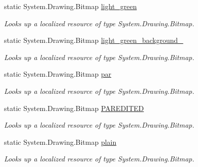 \begin{DoxyCompactItemize}
static System.\+Drawing.\+Bitmap \hyperlink{classWildlifeTrackingApp_1_1Properties_1_1Resources_a9d50b18360e8349f940ae5562791c430}{light\+\_\+green}
\begin{DoxyCompactList}\small\item\em Looks up a localized resource of type System.\+Drawing.\+Bitmap. \end{DoxyCompactList}\item 
static System.\+Drawing.\+Bitmap \hyperlink{classWildlifeTrackingApp_1_1Properties_1_1Resources_abb170f035e4e40293fc18a5ae75104c0}{light\+\_\+green\+\_\+background\+\_}
\begin{DoxyCompactList}\small\item\em Looks up a localized resource of type System.\+Drawing.\+Bitmap. \end{DoxyCompactList}\item 
static System.\+Drawing.\+Bitmap \hyperlink{classWildlifeTrackingApp_1_1Properties_1_1Resources_a22fc764559548610cceff5de0437f793}{par}
\begin{DoxyCompactList}\small\item\em Looks up a localized resource of type System.\+Drawing.\+Bitmap. \end{DoxyCompactList}\item 
static System.\+Drawing.\+Bitmap \hyperlink{classWildlifeTrackingApp_1_1Properties_1_1Resources_a08e964ce4a55697ad449abbceae82448}{P\+A\+R\+E\+D\+I\+T\+ED}
\begin{DoxyCompactList}\small\item\em Looks up a localized resource of type System.\+Drawing.\+Bitmap. \end{DoxyCompactList}\item 
static System.\+Drawing.\+Bitmap \hyperlink{classWildlifeTrackingApp_1_1Properties_1_1Resources_a515412ebae6fcb28be00cd8faa02bc4d}{plain}
\begin{DoxyCompactList}\small\item\em Looks up a localized resource of type System.\+Drawing.\+Bitmap. \end{DoxyCompactList}\item 

\end{DoxyCompactItemize}
